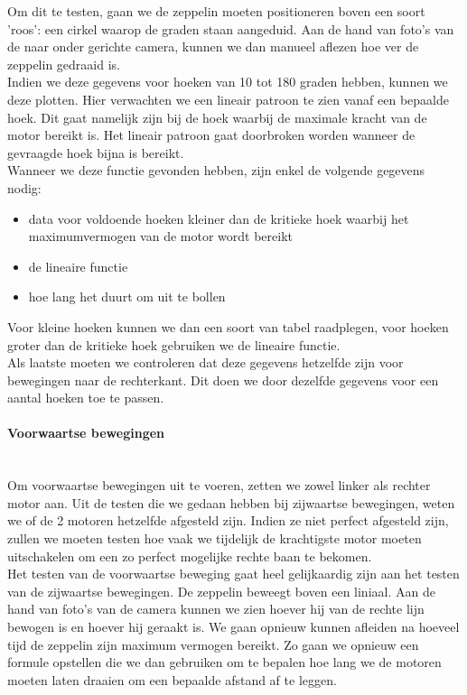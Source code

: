 \documentclass[tt]{penoverslag}
\begin{document}
Om dit te testen, gaan we de zeppelin moeten positioneren boven een soort 'roos': een cirkel waarop de graden staan aangeduid. Aan de hand van foto's van de naar onder gerichte camera, kunnen we dan manueel aflezen hoe ver de zeppelin gedraaid is. \\

Indien we deze gegevens voor hoeken van 10 tot 180 graden hebben, kunnen we deze plotten. Hier verwachten we een lineair patroon te zien vanaf een bepaalde hoek. Dit gaat namelijk zijn bij de hoek waarbij de maximale kracht van de motor bereikt is. Het lineair patroon gaat doorbroken worden wanneer de gevraagde hoek bijna is bereikt. \\

Wanneer we deze functie gevonden hebben, zijn enkel de volgende gegevens nodig:
\begin{itemize}
	\item data voor voldoende hoeken kleiner dan de kritieke hoek waarbij het maximumvermogen van de motor wordt bereikt
	\item de lineaire functie
	\item hoe lang het duurt om uit te bollen
\end{itemize}
Voor kleine hoeken kunnen we dan een soort van tabel raadplegen, voor hoeken groter dan de kritieke hoek gebruiken we de lineaire functie. \\

Als laatste moeten we controleren dat deze gegevens hetzelfde zijn voor bewegingen naar de rechterkant.  Dit doen we door dezelfde gegevens voor een aantal hoeken toe te passen. \\

\paragraph{Voorwaartse bewegingen} ~\\ 
Om voorwaartse bewegingen uit te voeren, zetten we zowel linker als rechter motor aan. Uit de testen die we gedaan hebben bij zijwaartse bewegingen, weten we of de 2 motoren hetzelfde afgesteld zijn. Indien ze niet perfect afgesteld zijn, zullen we moeten testen hoe vaak we tijdelijk de krachtigste motor moeten uitschakelen om een zo perfect mogelijke rechte baan te bekomen. \\

Het testen van de voorwaartse beweging gaat heel gelijkaardig zijn aan het testen van de zijwaartse bewegingen.  De zeppelin beweegt boven een liniaal.  Aan de hand van foto's van de camera kunnen we zien hoever hij van de rechte lijn bewogen is en hoever hij geraakt is. We gaan opnieuw kunnen afleiden na hoeveel tijd de zeppelin zijn maximum vermogen bereikt. Zo gaan we opnieuw een formule opstellen die we dan gebruiken om te bepalen hoe lang we de motoren moeten laten draaien om een bepaalde afstand af te leggen. \\
\end{document}
